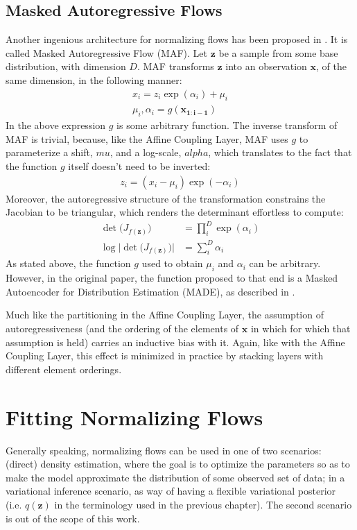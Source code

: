 \subsection{Masked Autoregressive Flows}
Another ingenious architecture for normalizing flows has been proposed in \autocite{maf}.
It is called Masked Autoregressive Flow (MAF). Let $\bm{z}$ be a sample from
some base distribution, with dimension $D$. MAF transforms $\bm{z}$ into an
observation $\bm{x}$, of the same dimension, in the following manner:
\begin{align}
x_i = z_i \exp(\alpha_i) + \mu_i \\
\mu_i, \alpha_i = g(\bm{x_{1:i-1}})
\end{align}
In the above expression $g$ is some arbitrary function. The inverse transform of
MAF is trivial, because, like the Affine Coupling Layer, MAF uses $g$ to parameterize
a shift, $mu$, and a log-scale, $alpha$, which translates to the fact that the
function $g$ itself doesn't need to be inverted:
\begin{align}
z_i = (x_i - \mu_i)\exp(-\alpha_i)
\end{align}
Moreover, the autoregressive structure of the transformation constrains the
Jacobian to be triangular, which renders the determinant effortless to compute: 
\begin{align}
\det\big( J_{f(\bm{z})} \big) &= \prod_i^{D} \exp(\alpha_i) \\
\log \Big| \det \big( J_{f(\bm{z})} \big) \Big| &= \sum_i^{D} \alpha_i
\end{align}
As stated above, the function $g$ used to obtain $\mu_i$ and $\alpha_i$ can be
arbitrary. However, in the original paper, the function proposed to that end
is a Masked Autoencoder for Distribution Estimation (MADE), as described in
\autocite{MADE}.

Much like the partitioning in the Affine Coupling Layer, the assumption of
autoregressiveness (and the ordering of the elements of $\bm{x}$ in which
for which that assumption is held) carries an inductive bias with it. Again,
like with the Affine Coupling Layer, this effect is minimized in practice by
stacking layers with different element orderings.

\section{Fitting Normalizing Flows}

Generally speaking, normalizing flows can be used in one of two scenarios:
(direct) density estimation, where the goal is to optimize the parameters
so as to make the model approximate the distribution of some observed set of data;
in a variational inference scenario, as way of having a flexible variational
posterior (i.e. $q(\bm{z})$ in the terminology used in the previous chapter). The
second scenario is out of the scope of this work.

